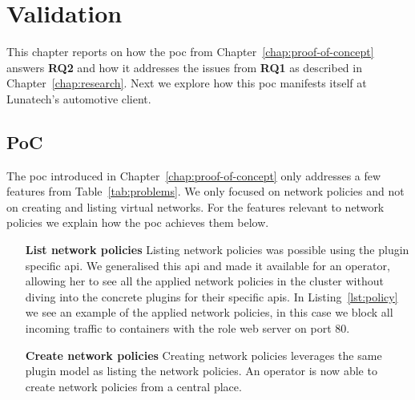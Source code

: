 \chapter{Validation}
\label{chap:validation}
This chapter reports on how the \gls{poc} from Chapter~\ref{chap:proof-of-concept} answers \textbf{RQ2} and how it addresses the issues from \textbf{RQ1} as described in Chapter~\ref{chap:research}. Next we explore how this \gls{poc} manifests itself at Lunatech's automotive client.

\section{PoC}
The \gls{poc} introduced in Chapter~\ref{chap:proof-of-concept} only addresses a few features from Table~\ref{tab:problems}. We only focused on network policies and not on creating and listing virtual networks. For the features relevant to network policies we explain how the \gls{poc} achieves them below.
\begin{itemize}
    \item[\textbf{List network policies}] Listing network policies was possible using the plugin specific \gls{api}. We generalised this \gls{api} and made it available for an operator, allowing her to see all the applied network policies in the cluster without diving into the concrete plugins for their specific \glspl{api}. In Listing~\ref{lst:policy} we see an example of the applied network policies, in this case we block all incoming traffic to containers with the role web server on port 80.
    \item[\textbf{Create network policies}] Creating network policies leverages the same plugin model as listing the network policies. An operator is now able to create network policies from a central place.
\end{itemize}


